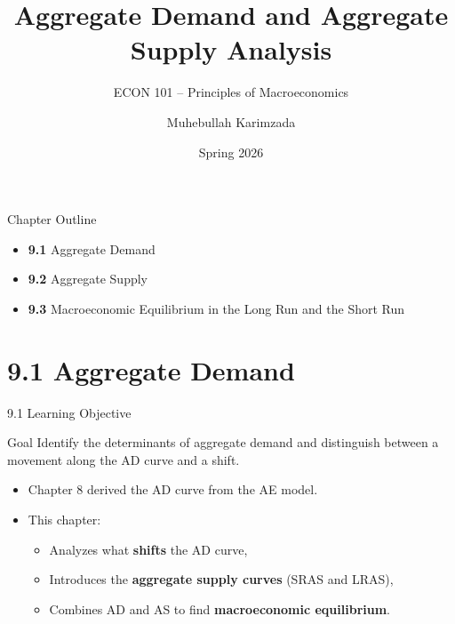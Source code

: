 \documentclass[aspectratio=169]{beamer}
\title{\textbf{Aggregate Demand and Aggregate Supply Analysis}}
\subtitle{{\large ECON 101 -- Principles of Macroeconomics}}
\author{Muhebullah Karimzada}
\date{Spring 2026}
\begin{document}

\begin{frame}[plain]
  \titlepage
\end{frame}

\begin{frame}{Chapter Outline}
\transfade
\begin{itemize}[<+->]
  \item \textbf{9.1} Aggregate Demand
  \item \textbf{9.2} Aggregate Supply
  \item \textbf{9.3} Macroeconomic Equilibrium in the Long Run and the Short Run
\end{itemize}
\end{frame}

\section{9.1 Aggregate Demand}

\begin{frame}{9.1 Learning Objective}
\transfade
\begin{block}{Goal}
Identify the determinants of aggregate demand and distinguish between a movement along the AD curve and a shift.
\end{block}
\begin{itemize}[<+->]
  \item Chapter 8 derived the AD curve from the AE model.
  \item This chapter:
  \begin{itemize}[<+->]
    \item Analyzes what \textbf{shifts} the AD curve,
    \item Introduces the \textbf{aggregate supply curves} (SRAS and LRAS),
    \item Combines AD and AS to find \textbf{macroeconomic equilibrium}.
  \end{itemize}
\end{itemize}
\end{frame}
\end{document}
